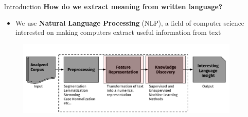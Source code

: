 \documentclass[10pt,xcolor=table]{beamer}
\begin{document}
\begin{frame}{Introduction}
\large  \textbf{How do we extract meaning from written language?} \hfill

\begin{itemize}
\item[] {{We use \textbf{Natural Language Processing} (NLP), a field of computer science interested on making computers extract useful information from text}}
\end{itemize}
\begin{figure}
\centering
\includegraphics[width=1\linewidth]{image2/Chapitre1/nlp_flow2}
\end{figure}
\vspace{\textheight}
\end{frame}
\end{document}

